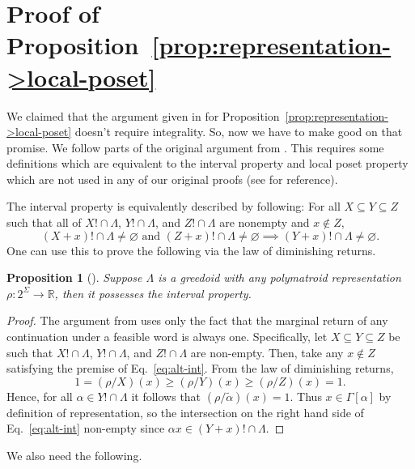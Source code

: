 \documentclass[11pt]{article}
\newtheorem{proposition}[theorem]{Proposition}
\newcommand{\univ}{\Sigma}
\newcommand{\glang}{\Lambda}
\begin{document}
\section{Proof of Proposition~\ref{prop:representation->local-poset}}\label{app:deferred-lp}

We claimed that the argument given in \cite{korte1985polymatroid} for Proposition~\ref{prop:representation->local-poset} doesn't require integrality.
So, now we have to make good on that promise.
We follow parts of the original argument from \cite{korte1985polymatroid}.
This requires some definitions which are equivalent to the interval property and local poset property which are not used in any of our original proofs (see \cite{korte2012greedoids} for reference).

The interval property is equivalently described by following:
For all $X\subseteq Y \subseteq Z$ such that all of $X!\cap\glang$, $Y!\cap\glang$, and $Z!\cap \glang$ are nonempty and $x \notin Z$,
\begin{equation}\label{eq:alt-int}
        (X + x)!\cap \glang \neq \varnothing\text{ and }(Z + x)! \cap \glang\neq \varnothing \implies (Y+x)!\cap \glang \neq \varnothing.
\end{equation}
One can use this to prove the following via the law of diminishing returns.
\begin{proposition}[\cite{korte1985polymatroid}]\label{prop:int}
    Suppose $\glang$ is a greedoid with any polymatroid representation $\rho:2^\univ\to\mathbb{R}$, then it possesses the interval property. 
\end{proposition}
\begin{proof}
    The argument from \cite{korte1985polymatroid} uses only the fact that the marginal return of any continuation under a feasible word is always one.
    Specifically, let $X \subseteq Y \subseteq Z$ be such that $X!\cap\glang$, $Y!\cap\glang$, and $Z!\cap\glang$ are non-empty.
    Then, take any $x\notin Z$ satisfying the premise of Eq.~\ref{eq:alt-int}.
    From the law of diminishing returns,
    \[
    1 = (\rho/X)(x) \geq (\rho/Y)(x) \geq (\rho/Z)(x) = 1.
    \]
    Hence, for all $\alpha \in Y!\cap\glang$
    it follows that $(\rho/\widetilde{\alpha})(x) = 1$.
    Thus $x \in \Gamma[\alpha]$ by definition of representation, so the intersection on the right hand side of Eq.~\ref{eq:alt-int} non-empty since $\alpha x \in (Y +x)!\cap\glang$.
\end{proof}

We also need the following.
\end{document}
